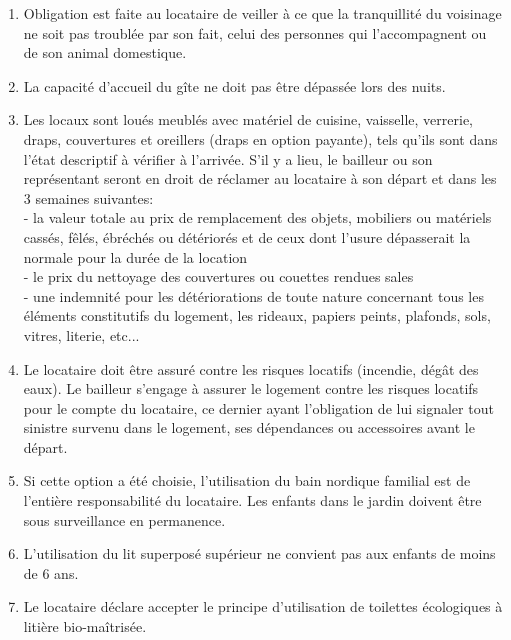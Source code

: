 \documentclass[a4paper,11pt]{article}
\begin{document}
\begin{enumerate}
\item Obligation est faite au locataire de veiller à ce que la tranquillité du voisinage ne soit pas troublée par son fait, celui des personnes qui l'accompagnent ou de son animal domestique.

\item La capacité d'accueil du gîte ne doit pas être dépassée lors des nuits.



\item Les locaux sont loués meublés avec matériel de cuisine, vaisselle, verrerie, draps, couvertures et oreillers (draps en option payante), tels qu’ils sont dans l’état descriptif à vérifier à l'arrivée.
S’il y a lieu, le bailleur ou son représentant seront en droit de réclamer au locataire à son départ et dans les 3 semaines suivantes:\\
- la valeur totale au prix de remplacement des objets, mobiliers ou matériels cassés, fêlés, ébréchés ou détériorés et de ceux dont l’usure dépasserait la normale pour la durée de la location\\
- le prix du nettoyage des couvertures ou couettes rendues sales\\
- une indemnité pour les détériorations de toute nature concernant tous les éléments constitutifs du logement, les rideaux, papiers peints, plafonds, sols, vitres, literie, etc...\\



\item Le locataire doit être assuré contre les risques locatifs (incendie, dégât des eaux). 
Le bailleur s'engage à assurer le logement contre les risques locatifs pour le compte du locataire, ce dernier ayant l'obligation de lui signaler  tout sinistre survenu dans le logement, ses dépendances ou accessoires avant le départ.

\item Si cette option a été choisie, l'utilisation du bain nordique familial est de l'entière responsabilité du locataire. Les enfants dans le jardin doivent être sous surveillance en permanence. 



\item L'utilisation du lit superposé supérieur ne convient pas aux enfants de moins de 6 ans.

\item Le locataire déclare accepter le principe d'utilisation de toilettes écologiques à litière bio-maîtrisée.


\end{enumerate}
\end{document}
